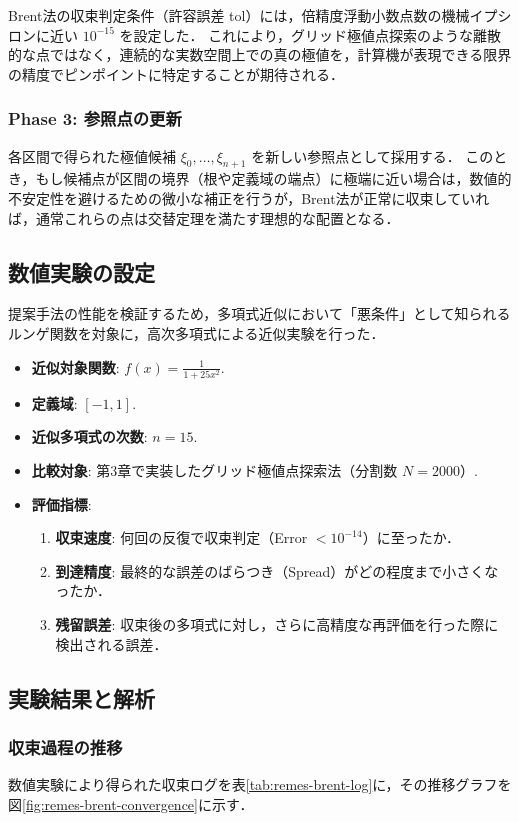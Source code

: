 Brent法の収束判定条件（許容誤差 tol）には，倍精度浮動小数点数の機械イプシロンに近い $10^{-15}$ を設定した．
これにより，グリッド極値点探索のような離散的な点ではなく，連続的な実数空間上での真の極値を，計算機が表現できる限界の精度でピンポイントに特定することが期待される．

\subsubsection{Phase 3: 参照点の更新}
各区間で得られた極値候補 $\xi_0, \dots, \xi_{n+1}$ を新しい参照点として採用する．
このとき，もし候補点が区間の境界（根や定義域の端点）に極端に近い場合は，数値的不安定性を避けるための微小な補正を行うが，Brent法が正常に収束していれば，通常これらの点は交替定理を満たす理想的な配置となる．

\subsection{数値実験の設定}
  \label{subsec:numerical_experiment}
提案手法の性能を検証するため，多項式近似において「悪条件」として知られるルンゲ関数を対象に，高次多項式による近似実験を行った．

\begin{itemize}
    \item \textbf{近似対象関数}: $f(x) = \frac{1}{1+25x^2}.$
    \item \textbf{定義域}: $[-1, 1].$
    \item \textbf{近似多項式の次数}: $n=15.$
    \item \textbf{比較対象}: 第3章で実装したグリッド極値点探索法（分割数 $N=2000$）.
    \item \textbf{評価指標}:
    \begin{enumerate}
        \item \textbf{収束速度}: 何回の反復で収束判定（Error $< 10^{-14}$）に至ったか．
        \item \textbf{到達精度}: 最終的な誤差のばらつき（Spread）がどの程度まで小さくなったか．
        \item \textbf{残留誤差}: 収束後の多項式に対し，さらに高精度な再評価を行った際に検出される誤差．
    \end{enumerate}
\end{itemize}

\subsection{実験結果と解析}

\subsubsection{収束過程の推移}
数値実験により得られた収束ログを表\ref{tab:remes-brent-log}に，その推移グラフを図\ref{fig:remes-brent-convergence}に示す．

